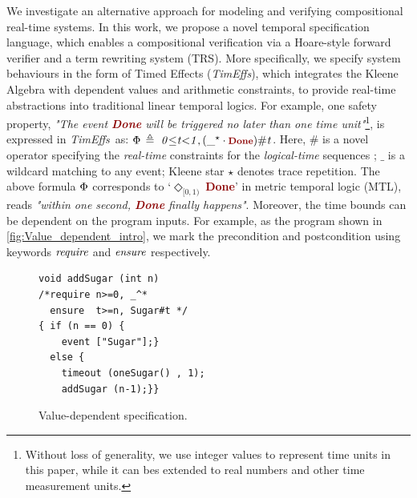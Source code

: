 \documentclass[acmsmall,10pt,review]{acmart}
\newcommand{\timedEffects}{\emph{TimEffs}}
\newcommand{\effect}{\textcolor{black}{\ensuremath{\mathrm{\Phi}}}}
\newcommand{\anyevent}[1]{{\textcolor{darkred}
{{\textbf{\footnotesize #1}}}}}
\newcommand{\code}[1]{{\tt{\ensuremath{\m{#1}}}}}
\newcommand{\m}{\mathit}
\def\defeq{\ensuremath{\,\triangleq}}
\begin{document}
We investigate an alternative approach for modeling and verifying 
compositional real-time systems. In this work, 
we propose a novel temporal specification language, 
which enables a compositional verification via a  Hoare-style 
forward verifier and a term rewriting system (TRS). 
More specifically, we specify system behaviours in the form of 
{Timed Effects} (\timedEffects), which integrates the Kleene Algebra with dependent values and arithmetic constraints, 
to 
provide real-time abstractions into traditional linear temporal logics. 
For example, one safety property, \textit{"The event \anyevent{Done} 
will be triggered no later than one time unit"}\footnote{Without loss of generality, 
we use integer values to represent time units in this 
paper, while it can bes extended to real numbers and other 
time measurement units.}, is expressed in \timedEffects\ as: 
\code{\effect \defeq \  0 {\leq} t {<}1, ({\_^\star} \cdot \anyevent{Done} ) \# t}.
Here, \code{\#} is a novel operator specifying the \emph{real-time} 
constraints for the \emph{logical-time} sequences \cite{von2017real}; 
\code{\_} is a wildcard matching to any event; 
Kleene star \code{\star} denotes trace repetition.
The above formula \code{\effect} corresponds to `\code{\Diamond_{[0, 1)}\ }\anyevent{Done}' 
in metric temporal logic (MTL), reads \textit{"within one second, 
\anyevent{Done} finally happens"}. Moreover, the time bounds 
can be dependent on the program inputs. For example, as the program 
shown in \autoref{fig:Value_dependent_intro}, we mark the precondition and postcondition
using keywords \code{\emph{require}} and \code{\emph{ensure}} respectively. 

\newcommand{\codem}[1]{{\code{\emph{#1}}}}

\begin{figure}
  \vspace{-2mm}
\begin{lstlisting}
void addSugar (int n) 
/*require n>=0, _^*
  ensure  t>=n, Sugar#t */
{ if (n == 0) { 
    event ["Sugar"];} 
  else {
    timeout (oneSugar() , 1);
    addSugar (n-1);}} 
\end{lstlisting}
\vspace{-1mm}
\caption{Value-dependent specification.} 
\label{fig:Value_dependent_intro}
\vspace{-1mm}
\end{figure}
\end{document}
